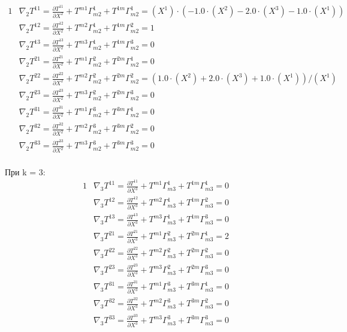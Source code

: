 \documentclass[a4paper, 12pt, oneside]{article}
\begin{document}
\begin{alignat*}{1}
  & \nabla_2T^{11} = \frac{\partial T^{11}}{\partial X^2} + T^{m1}\Gamma^1_{m2} + T^{1m}\Gamma^1_{m2} = (X^1)\cdot (-1.0\cdot (X^2) - 2.0\cdot (X^3) - 1.0\cdot (X^1)) \\
  & \nabla_2T^{12} = \frac{\partial T^{12}}{\partial X^2} + T^{m2}\Gamma^1_{m2} + T^{1m}\Gamma^2_{m2} = 1 \\
  & \nabla_2T^{13} = \frac{\partial T^{13}}{\partial X^2} + T^{m3}\Gamma^1_{m2} + T^{1m}\Gamma^3_{m2} = 0 \\
  & \nabla_2T^{21} = \frac{\partial T^{21}}{\partial X^2} + T^{m1}\Gamma^2_{m2} + T^{2m}\Gamma^1_{m2} = 0 \\
  & \nabla_2T^{22} = \frac{\partial T^{22}}{\partial X^2} + T^{m2}\Gamma^2_{m2} + T^{2m}\Gamma^2_{m2} = (1.0\cdot (X^2) + 2.0\cdot (X^3) + 1.0\cdot (X^1))/(X^1) \\
  & \nabla_2T^{23} = \frac{\partial T^{23}}{\partial X^2} + T^{m3}\Gamma^2_{m2} + T^{2m}\Gamma^3_{m2} = 0 \\
  & \nabla_2T^{31} = \frac{\partial T^{31}}{\partial X^2} + T^{m1}\Gamma^3_{m2} + T^{3m}\Gamma^1_{m2} = 0 \\
  & \nabla_2T^{32} = \frac{\partial T^{32}}{\partial X^2} + T^{m2}\Gamma^3_{m2} + T^{3m}\Gamma^2_{m2} = 0 \\
  & \nabla_2T^{33} = \frac{\partial T^{33}}{\partial X^2} + T^{m3}\Gamma^3_{m2} + T^{3m}\Gamma^3_{m2} = 0 
\end{alignat*}\\
При k = 3:\\
\begin{alignat*}{1}
  & \nabla_3T^{11} = \frac{\partial T^{11}}{\partial X^3} + T^{m1}\Gamma^1_{m3} + T^{1m}\Gamma^1_{m3} = 0 \\
  & \nabla_3T^{12} = \frac{\partial T^{12}}{\partial X^3} + T^{m2}\Gamma^1_{m3} + T^{1m}\Gamma^2_{m3} = 0 \\
  & \nabla_3T^{13} = \frac{\partial T^{13}}{\partial X^3} + T^{m3}\Gamma^1_{m3} + T^{1m}\Gamma^3_{m3} = 0 \\
  & \nabla_3T^{21} = \frac{\partial T^{21}}{\partial X^3} + T^{m1}\Gamma^2_{m3} + T^{2m}\Gamma^1_{m3} = 2 \\
  & \nabla_3T^{22} = \frac{\partial T^{22}}{\partial X^3} + T^{m2}\Gamma^2_{m3} + T^{2m}\Gamma^2_{m3} = 0 \\
  & \nabla_3T^{23} = \frac{\partial T^{23}}{\partial X^3} + T^{m3}\Gamma^2_{m3} + T^{2m}\Gamma^3_{m3} = 0 \\
  & \nabla_3T^{31} = \frac{\partial T^{31}}{\partial X^3} + T^{m1}\Gamma^3_{m3} + T^{3m}\Gamma^1_{m3} = 0 \\
  & \nabla_3T^{32} = \frac{\partial T^{32}}{\partial X^3} + T^{m2}\Gamma^3_{m3} + T^{3m}\Gamma^2_{m3} = 0 \\
  & \nabla_3T^{33} = \frac{\partial T^{33}}{\partial X^3} + T^{m3}\Gamma^3_{m3} + T^{3m}\Gamma^3_{m3} = 0 
\end{alignat*}\\
\end{document}
